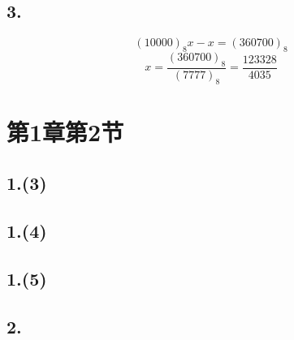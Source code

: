 \documentclass[12pt, a4paper, oneside]{ctexart}
\begin{document}
        \subsection*{3.}
            $$
                (10000)_8x-x=(360700)_8
            $$
            $$
                x=\frac{(360700)_8}{(7777)_8}=\frac{123328}{4035}
            $$
    \section*{第1章第2节}
        \subsection*{1.(3)}
        \subsection*{1.(4)}
        \subsection*{1.(5)}
        \subsection*{2.}
\end{document}
